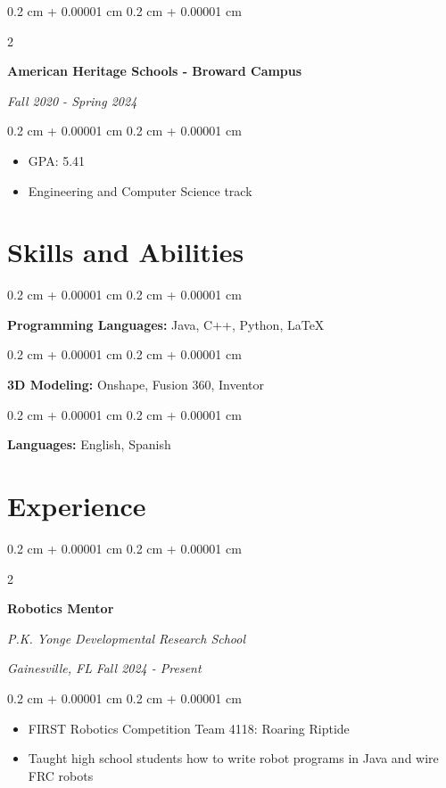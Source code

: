 \documentclass[10pt, letterpaper]{article}
\newenvironment{highlights}{
    \begin{itemize}[
        topsep=0.10 cm,
        parsep=0.10 cm,
        partopsep=0pt,
        itemsep=0pt,
        leftmargin=0.4 cm + 10pt
    ]
}{
    \end{itemize}
} %
\newenvironment{onecolentry}{
    \begin{adjustwidth}{
        0.2 cm + 0.00001 cm
    }{
        0.2 cm + 0.00001 cm
    }
}{
    \end{adjustwidth}
} %
\newenvironment{twocolentry}[2][]{
    \onecolentry
    \def\secondColumn{#2}
    \setcolumnwidth{\fill, 4.5 cm}
    \begin{paracol}{2}
}{
    \switchcolumn \raggedleft \secondColumn
    \end{paracol}
    \endonecolentry
} %
\begin{document}
        \begin{twocolentry}{
            
            
            \textit{Fall 2020 - Spring 2024}}
                \textbf{American Heritage Schools - Broward Campus}
    
            \end{twocolentry}
    
            \vspace{0.10 cm}
            \begin{onecolentry}
                \begin{highlights}
                    \item GPA: 5.41
                    \item Engineering and Computer Science track
                \end{highlights}
            \end{onecolentry}
    
        
    \section{Skills and Abilities}

        \begin{onecolentry}
            \textbf{Programming Languages:} Java, C++, Python, LaTeX
        \end{onecolentry}
        
        \begin{onecolentry}
            \textbf{3D Modeling:} Onshape, Fusion 360, Inventor  
        \end{onecolentry}

        \begin{onecolentry}
            \textbf{Languages:} English, Spanish
        \end{onecolentry}

    \section{Experience}
        \begin{twocolentry}{
        \textit{Gainesville, FL}    
        \textit{Fall 2024 - Present}}
            \textbf{Robotics Mentor}
            
            \textit{P.K. Yonge Developmental Research School}
        \end{twocolentry}

        \vspace{0.10 cm}
        \begin{onecolentry}
            \begin{highlights}
                \item FIRST Robotics Competition Team 4118: Roaring Riptide 
                \item Taught high school students how to write robot programs in Java and wire FRC robots 
            \end{highlights}
        \end{onecolentry}
\end{document}
